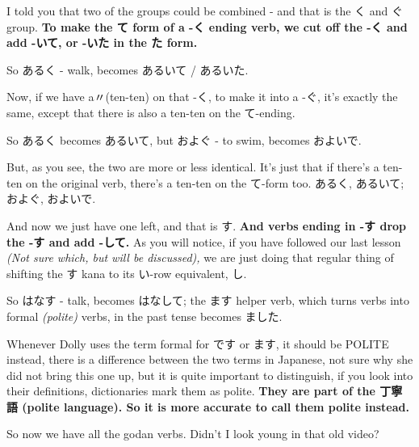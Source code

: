 \stopsectionlevel

\startsectionlevel[title={The Third & Fourth Godan Group},reference={the-third-fourth-godan-group}]

I told you that two of the groups could be combined - and that is the く and ぐ group. {\bf To make the て form of a -く ending verb, we cut off the -く and add -いて, or -いた in the た form.}

So あるく - walk, becomes あるいて / あるいた.

Now, if we have a〃(ten-ten) on that -く, to make it into a -ぐ, it's exactly the same, except that there is also a ten-ten on the て-ending.

{}

So あるく becomes あるいて, but およぐ - to swim, becomes およいで.

But, as you see, the two are more or less identical. It's just that if there's a ten-ten on the original verb, there's a ten-ten on the て-form too. あるく, あるいて; およぐ, およいで.

\stopsectionlevel

\startsectionlevel[title={The Fifth Godan Group},reference={the-fifth-godan-group}]

And now we just have one left, and that is す. {\bf And verbs ending in -す drop the -す and add -して.} As you will notice, if you have followed our last lesson {\em (Not sure which, but will be discussed),} we are just doing that regular thing of shifting the す kana to its い-row equivalent, し.

{}

So はなす - talk, becomes はなして; the ます helper verb, which turns verbs into formal {\em (polite)} verbs, in the past tense becomes ました.

Whenever Dolly uses the term formal for です or ます, it should be POLITE instead, there is a difference between the two terms in Japanese, not sure why she did not bring this one up, but it is quite important to distinguish, if you look into their definitions, dictionaries mark them as polite. {\bf They are part of the 丁寧語 (polite language). So it is more accurate to call them polite instead.}

So now we have all the godan verbs. Didn't I look young in that old video?

{}

\stopsectionlevel

